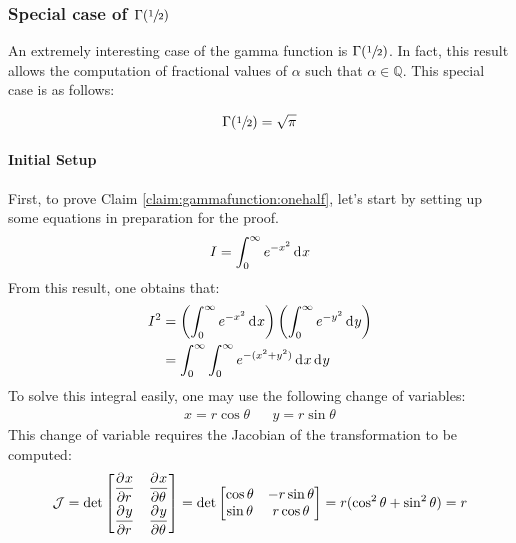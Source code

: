 \documentclass[12pt]{article}
\newcommand{\J}{\mathcal{J}}
\begin{document}
\pagebreak
\subsubsection{Special case of $\Gamma(\sfrac{1}{2})$}
An extremely interesting case of the gamma function is $\Gamma(\sfrac{1}{2})$. In fact, this result allows the
computation of fractional values of $\alpha$ such that $\alpha\in\mathbb{Q}$. This special case is as follows:
\begin{claim}\label{claim:gammafunction:onehalf}
	\begin{equation*}
		\Gamma(\sfrac{1}{2})=\sqrt{\pi}
	\end{equation*}
\end{claim}

\paragraph{Initial Setup}
First, to prove Claim \ref{claim:gammafunction:onehalf}, let's start by setting up some equations in preparation for the
proof.
\begin{equation}\label{eq:gammafunction:i}
	I = \int^\infty_0 e^{-x^2}\mathop{}\!\mathrm{d^{}}x
\end{equation}
From this result, one obtains that:
\begin{equation}\label{eq:gammafunction:isquared}
	\begin{split}
		I^2	&=	\left(\int^\infty_0 e^{-x^2}\mathop{}\!\mathrm{d^{}}x\right)\left(\int^\infty_0 e^{-y^2}\mathop{}\!\mathrm{d^{}}y\right)\\
			&=	\int^\infty_0\int^\infty_0 e^{-(x^2+y^2)}\mathop{}\!\mathrm{d^{}}x\mathop{}\!\mathrm{d^{}}y
	\end{split}
\end{equation}
To solve this integral easily, one may use the following change of variables:
\begin{align*}
	x=r\cos\theta	&&	y=r\sin\theta
\end{align*}
This change of variable requires the Jacobian of the transformation to be computed:
\begin{equation}\label{eq:gammafunction:jacobian}
	\J = \det\begin{bmatrix}
		\pderiv{x}{r}	&	\pderiv{x}{\theta}\\[6pt]
		\pderiv{y}{r}	&	\pderiv{y}{\theta}
		\end{bmatrix} = \det\begin{bmatrix}
			\cos\theta	&	-r\sin\theta\\
			\sin\theta	&	r\cos\theta
		\end{bmatrix} = r(\cos^2\theta + \sin^2\theta) = r
\end{equation}
\end{document}
